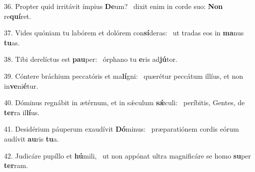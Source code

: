 36. Propter quid irritávit ímpius \textbf{De}um? \ast\  dixit enim in corde suo: \textbf{Non} re\textbf{quí}ret.\

37. Vides quóniam tu labórem et dolórem con\textbf{sí}deras: \ast\  ut tradas eos in \textbf{ma}nus \textbf{tu}as.\

38. Tibi derelíctus est \textbf{pau}per: \ast\  órphano tu \textbf{e}ris ad\textbf{jú}tor.\

39. Cóntere bráchium peccatóris et ma\textbf{lí}gni: \ast\  quærétur peccátum illíus, et non in\textbf{ve}ni\textbf{é}tur.\

40. Dóminus regnábit in ætérnum, et in sǽculum \textbf{sǽ}culi: \ast\  períbitis, Gentes, de \textbf{ter}ra il\textbf{lí}us.\

41. Desidérium páuperum exaudívit \textbf{Dó}minus: \ast\  præparatiónem cordis eórum audívit \textbf{au}ris \textbf{tu}a.\

42. Judicáre pupíllo et \textbf{hú}mili, \ast\  ut non appónat ultra magnificáre se homo \textbf{su}per \textbf{ter}ram.\

